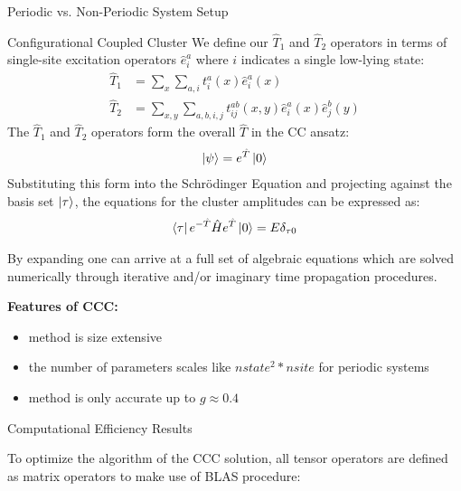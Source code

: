 \documentclass[final]{beamer}
\newlength{\onecolwid}
\newlength{\twocolwid}
\begin{document}
\begin{frame}[t]
\begin{columns}[t]
\begin{column}{\twocolwid}
\begin{columns}[t,totalwidth=\twocolwid]
\begin{column}{\onecolwid}
\begin{block}{Periodic vs. Non-Periodic System Setup}
\end{block}
\vspace{-2em}
\begin{block}{Configurational Coupled Cluster}
    We define our $\hat{T}_{1}$ and $\hat{T}_{2}$ operators in terms of single-site excitation operators $\hat{e}^{a}_{i}$ where $i$ indicates a single low-lying state:
    \begin{align}
        \hat{T}_1&= \sum_{x} \sum_{a,i} t^{a}_{i}(x) \hat{e}^{a}_{i}(x)\\
        \hat{T}_2&= \sum_{x,y} \sum_{a,b,i,j} t^{ab}_{ij}(x, y) \hat{e}^{a}_{i}(x) \hat{e}^{b}_{j}(y)
    \end{align}
    The $\hat{T}_{1}$ and $\hat{T}_{2}$ operators form the overall $\hat{T}$ in the CC ansatz:
    \begin{align}
        \ket{\psi} = e^{\hat{T}}\ket{0}
    \end{align}
    Substituting this form into the Schrödinger Equation and projecting against the basis set $\ket{\tau}$, the equations for the cluster amplitudes can be expressed as:
    \begin{align}
        \bra{\tau} e^{-\hat{T}} \hat{H} e^{\hat{T}} \ket{0} = E \delta_{\tau 0}
    \end{align}

    By expanding one can arrive at a full set of algebraic equations which are solved numerically through iterative and/or imaginary time propagation procedures.\newline

    \textbf{Features of CCC:}
    \begin{itemize}
        \item method is size extensive
        \item the number of parameters scales like $nstate^2 * nsite$ for periodic systems
        \item method is only accurate up to $g \approx 0.4$
    \end{itemize}

\end{block}

\begin{block}{Computational Efficiency Results}

To optimize the algorithm of the CCC solution, all tensor operators are defined as matrix operators to make use of BLAS procedure:

\begin{table}[h!]
\centering
\caption{Computation time comparison for periodic vs non-periodic systems. ($g = 0.2$).}
\label{tab:system_times_periodic}
\vspace{-2em}


\end{table}
\end{block}
\end{column}
\end{columns}
\end{column}
\end{columns}
\end{frame}
\end{document}

